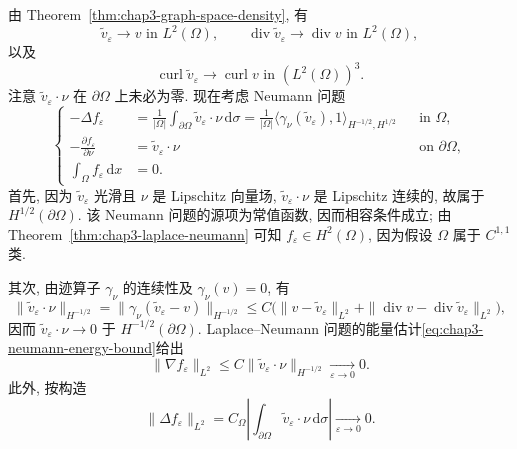 \begin{Proof}
\begin{enumerate}
 由 Theorem~\ref{thm:chap3-graph-space-density}, 有
 \[
  \widetilde v_\varepsilon\to v\text{ in }L^2(\Omega),\qquad
  \operatorname{div}\widetilde v_\varepsilon\to\operatorname{div}v\text{ in }L^2(\Omega),
 \]
 以及
 \[
  \operatorname{curl}\widetilde v_\varepsilon\to\operatorname{curl}v
  \text{ in }(L^2(\Omega))^3.
 \]
 注意 $\widetilde v_\varepsilon\cdot\nu$ 在 $\partial\Omega$ 上未必为零. 现在考虑 Neumann 问题
 \[
 \left\{
 \begin{aligned}
 -\Delta f_\varepsilon
 &=\frac1{|\Omega|}\int_{\partial\Omega}\widetilde v_\varepsilon\cdot\nu\,\mathrm d\sigma
 =\frac1{|\Omega|}\langle\gamma_\nu(\widetilde v_\varepsilon),1\rangle_{H^{-1/2},H^{1/2}}
 &&\text{in }\Omega,\\
 -\frac{\partial f_\varepsilon}{\partial\nu}
 &=\widetilde v_\varepsilon\cdot\nu&&\text{on }\partial\Omega,\\
 \int_\Omega f_\varepsilon\,\mathrm dx&=0.
 \end{aligned}
 \right.
 \]
 首先, 因为 $\widetilde v_\varepsilon$ 光滑且 $\nu$ 是 Lipschitz 向量场,
 $\widetilde v_\varepsilon\cdot\nu$ 是 Lipschitz 连续的, 故属于 $H^{1/2}(\partial\Omega)$.
 该 Neumann 问题的源项为常值函数, 因而相容条件成立; 由
 Theorem~\ref{thm:chap3-laplace-neumann} 可知 $f_\varepsilon\in H^2(\Omega)$,
 因为假设 $\Omega$ 属于 $C^{1,1}$ 类.

 其次, 由迹算子 $\gamma_\nu$ 的连续性及 $\gamma_\nu(v)=0$, 有
 \[
  \|\widetilde v_\varepsilon\cdot\nu\|_{H^{-1/2}}
  =\|\gamma_\nu(\widetilde v_\varepsilon-v)\|_{H^{-1/2}}
  \leq C\bigl(\|v-\widetilde v_\varepsilon\|_{L^2}
  +\|\operatorname{div}v-\operatorname{div}\widetilde v_\varepsilon\|_{L^2}\bigr),
 \]
 因而 $\widetilde v_\varepsilon\cdot\nu\to0$ 于 $H^{-1/2}(\partial\Omega)$.
 Laplace--Neumann 问题的能量估计\eqref{eq:chap3-neumann-energy-bound}给出
 \[
  \|\nabla f_\varepsilon\|_{L^2}
  \leq C\|\widetilde v_\varepsilon\cdot\nu\|_{H^{-1/2}}
  \underset{\varepsilon\to0}{\longrightarrow}0.
 \]
 此外, 按构造
 \[
  \|\Delta f_\varepsilon\|_{L^2}
  =C_\Omega\left|\int_{\partial\Omega}\widetilde v_\varepsilon\cdot\nu\,\mathrm d\sigma\right|
  \underset{\varepsilon\to0}{\longrightarrow}0.
 \]


\end{enumerate}
\end{Proof}
